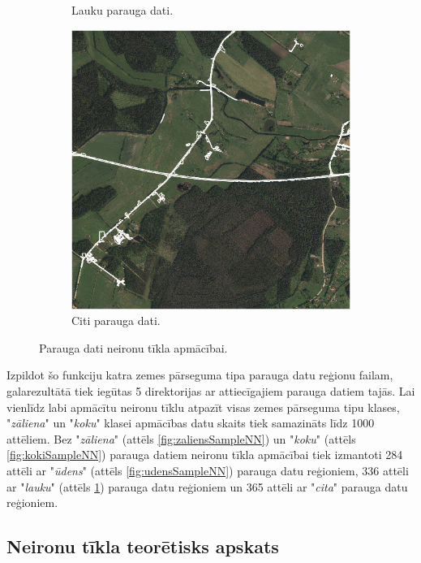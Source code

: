 \documentclass[12pt,paper=a4]{report}
\begin{document}
\begin{figure}[h!]
\begin{subfigure}[b]{.32\linewidth}
\caption{Lauku parauga dati.}\label{fig:lauksSampleNN}
\end{subfigure}
\begin{subfigure}[b]{.32\linewidth}
\includegraphics[width=\linewidth]{citsSampleNN}
\caption{Citi parauga dati.}\label{fig:citsSampleNN}
\end{subfigure}
\label{fig:sampleNN}
\caption{Parauga dati neironu tīkla apmācībai.}
\end{figure}\par
Izpildot šo funkciju katra zemes pārseguma tipa parauga datu reģionu failam, galarezultātā tiek iegūtas 5 direktorijas ar attiecīgajiem parauga datiem tajās. Lai vienlīdz labi apmācītu neironu tīklu atpazīt visas zemes pārseguma tipu klases, "\textit{zāliena}" un "\textit{koku}" klasei apmācības datu skaits tiek samazināts līdz 1000 attēliem. Bez "\textit{zāliena}" (attēls \ref{fig:zaliensSampleNN}) un "\textit{koku}" (attēls \ref{fig:kokiSampleNN}) parauga datiem neironu tīkla apmācībai tiek izmantoti 284 attēli ar "\textit{ūdens}" (attēls \ref{fig:udensSampleNN}) parauga datu reģioniem, 336 attēli ar "\textit{lauku}" (attēls \ref{fig:lauksSampleNN}) parauga datu reģioniem un 365 attēli ar "\textit{cita}" parauga datu reģioniem.
\subsection{Neironu tīkla teorētisks apskats}
\end{document}
